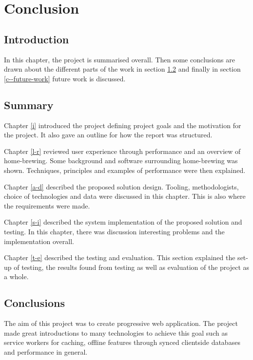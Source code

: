 \chapter{Conclusion} \label{c}

\section{Introduction} \label{c--introduction}

In this chapter, the project is summarised overall. Then some conclusions are drawn about the different parts of the work in section \ref{c--summary} and finally in section \ref{c--future-work} future work is discussed.

\section{Summary} \label{c--summary}

Chapter \ref{i} introduced the project defining project goals and the motivation for the project. It also gave an outline for how the report was structured.

Chapter \ref{l-r} reviewed user experience through performance and an overview of home-brewing. Some background and software surrounding home-brewing was shown. Techniques, principles and examples of performance were then explained.

Chapter \ref{a-d} described the proposed solution design. Tooling, methodologists, choice of technologies and data were discussed in this chapter. This is also where the requirements were made.

Chapter \ref{s-i} described the system implementation of the proposed solution and testing. In this chapter, there was discussion interesting problems and the implementation overall.

Chapter \ref{t-e} described the testing and evaluation. This section explained the set-up of testing, the results found from testing as well as evaluation of the project as a whole.

\section{Conclusions} \label{c--conclusions}

The aim of this project was to create progressive web application. The project made great introductions to many technologies to achieve this goal such as service workers for caching, offline features through synced clientside databases and performance in general.

